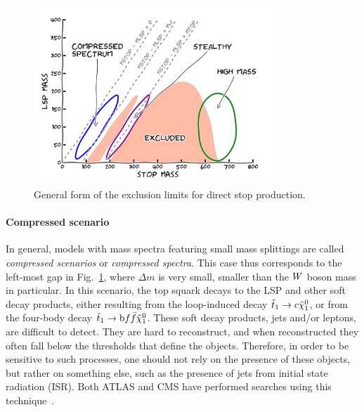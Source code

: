 \begin{figure}[htpb]
  \centering
  \includegraphics[width=0.8\textwidth]{figures/razor_motivation/story_boost_motivation}
  \caption{General form of the exclusion limits for direct stop production. 
  \label{fig:boost_story_motivation}}
\end{figure}

\paragraph{Compressed scenario}
In general, models with mass spectra featuring small mass splittings are called \textit{compressed
scenarios} or \textit{compressed spectra}. This case thus corresponds to the left-most gap in
Fig.~\ref{fig:boost_story_motivation}, where $\Delta m$ is very small, smaller than the $W$ boson
mass in particular. 
In this scenario, the top squark decays to the LSP and other soft decay products, either resulting
from the loop-induced decay $\tilde{t}_1 \rightarrow c \tilde{\chi}_1^0$, or from the four-body decay $\tilde{t}_1
\rightarrow \mathrm{b} f \bar{f} \tilde{\chi}_1^0$. These soft decay products, jets and/or leptons, are difficult to
detect. They are hard to reconstruct, and when reconstructed they often fall below the \pt
thresholds that define the objects. 
Therefore, in order to be sensitive to such processes, one should not rely on the presence of
these objects, but rather on something else, such as the presence of jets from initial state
radiation (ISR). Both ATLAS and CMS have performed searches using this
technique~\cite{CMS-PAS-SUS-13-009,Aad:2014nra}. 

